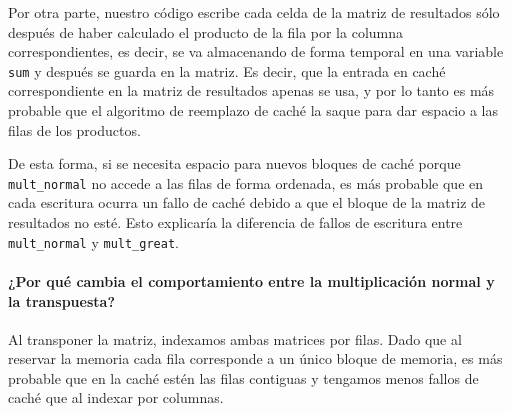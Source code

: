 \documentclass[nochap]{apuntes}
\begin{document}
Por otra parte, nuestro código escribe cada celda de la matriz de resultados sólo después de haber calculado el producto de la fila por la columna correspondientes, es decir, se va almacenando de forma temporal en una variable \texttt{sum} y después se guarda en la matriz. Es decir, que la entrada en caché correspondiente en la matriz de resultados apenas se usa, y por lo tanto es más probable que el algoritmo de reemplazo de caché la saque para dar espacio a las filas de los productos.

De esta forma, si se necesita espacio para nuevos bloques de caché porque \texttt{mult\_normal} no accede a las filas de forma ordenada, es más probable que  en cada escritura ocurra un fallo de caché debido a que el bloque de la matriz de resultados no esté. Esto explicaría la diferencia de fallos de escritura entre \texttt{mult\_normal} y \texttt{mult\_great}.

\paragraph{¿Por qué cambia el comportamiento entre la multiplicación normal y la transpuesta?}

Al transponer la matriz, indexamos ambas matrices por filas. Dado que al reservar la memoria cada fila corresponde a un único bloque de memoria, es más probable que en la caché estén las filas contiguas y tengamos menos fallos de caché que al indexar por columnas.

 
\end{document}

